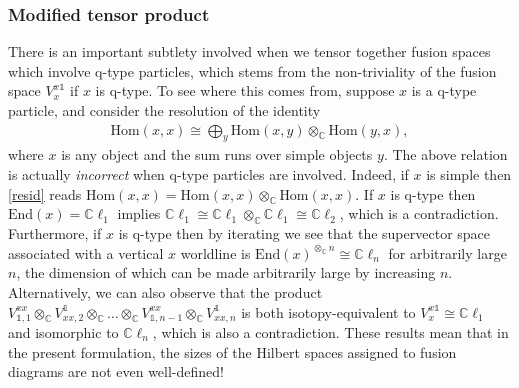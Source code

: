\documentclass[12pt,a4paper]{article}
\newcommand{\tp}{\otimes}
\newcommand{\unit}{\mathds{1}}
\newcommand{\cc}{\mathbb{C}}
\newcommand{\Hom}{\text{Hom}}
\newcommand{\End}{\text{End}}
\newcommand{\cl}{\mathbb{C}\ell}
\begin{document}
\subsubsection{Modified tensor product} \label{modified_tensor_product}
There is an important subtlety involved when we tensor together fusion spaces which involve q-type particles, which stems from the non-triviality of the fusion space $V^{x\unit}_x$ if $x$ is q-type.
To see where this comes from, suppose $x$ is a q-type particle, and consider the resolution of the identity 
\begin{align} \label{resid}
\Hom(x,x) \cong \bigoplus_y \Hom(x,y) \tp_\cc \Hom(y,x),
\end{align}
where $x$ is any object and the sum runs over simple objects $y$. 
The above relation is actually {\it incorrect} when q-type particles are involved. 
Indeed, if $x$ is simple then \eqref{resid} reads $\Hom(x,x) = \Hom(x,x) \tp_\cc \Hom(x,x).$ 
If $x$ is q-type then $\End(x) = \cl_1$ implies $\cl_1 \cong \cl_1\tp_\cc \cl_1 \cong \cl_2$, which is a contradiction. 
Furthermore, if $x$ is q-type then by iterating we see that the supervector space associated with a vertical $x$ worldline is $\End(x)^{\tp_{\cc} n} \cong \cl_n$ for arbitrarily large $n$, the dimension of which can be made arbitrarily large by increasing $n$. 
Alternatively, we can also observe that the product $V_{\unit,1}^{xx} \tp_\cc V^\unit_{xx,2} \tp_\cc \dots \tp_\cc V_{\unit,n-1}^{xx} \tp_\cc V^\unit_{xx,n}$ is both isotopy-equivalent to $V^{x\unit}_x \cong \cl_1$ and isomorphic to $\cl_n$, which is also a contradiction. 
These results mean that in the present formulation, the sizes of the Hilbert spaces assigned to fusion diagrams are not even well-defined! 
\end{document}
